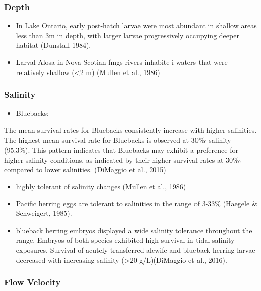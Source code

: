 \documentclass[
]{book}
\providecommand{\tightlist}{%
  \setlength{\itemsep}{0pt}\setlength{\parskip}{0pt}}
\begin{document}
\hypertarget{depth-5}{%
\subsubsection{Depth}\label{depth-5}}

\begin{itemize}
\tightlist
\item
  In Lake Ontario, early post-hatch larvae were most abundant in shallow areas less than 3m in depth, with larger larvae progressively occupying deeper habitat (Dunstall 1984).
\item
  Larval Alosa in Nova Scotian fmgs rivers inhabite-i-waters that were relatively shallow (\textless2 m) (Mullen et al., 1986)
\end{itemize}

\hypertarget{salinity-5}{%
\subsubsection{Salinity}\label{salinity-5}}

\begin{itemize}
\tightlist
\item
  Bluebacks:
\end{itemize}

The mean survival rates for Bluebacks consistently increase with higher salinities.
The highest mean survival rate for Bluebacks is observed at 30‰ salinity (95.3\%).
This pattern indicates that Bluebacks may exhibit a preference for higher salinity conditions, as indicated by their higher survival rates at 30‰ compared to lower salinities. (DiMaggio et al., 2015)

\begin{itemize}
\item
  highly tolerant of salinity changes (Mullen et al., 1986)
\item
  Pacific herring eggs are tolerant to salinities in the range of 3-33\% (Haegele \& Schweigert, 1985).
\item
  blueback herring embryos displayed a wide salinity tolerance throughout the range. Embryos of both species exhibited high survival in tidal salinity exposures. Survival of acutely-transferred alewife and blueback herring larvae decreased with increasing salinity (\textgreater20 g/L)(DiMaggio et al., 2016).
\end{itemize}

\hypertarget{flow-velocity-5}{%
\subsubsection{Flow Velocity}\label{flow-velocity-5}}
\end{document}
